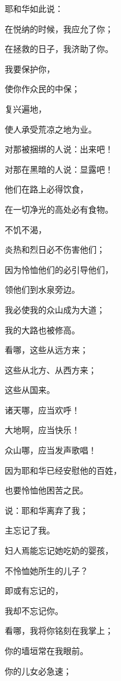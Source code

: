 {\par }{\Q {}耶和华如此说：
\par }{\Q 在悦纳的时候，我应允了你；
\par }{\Q 在拯救的日子，我济助了你。
\par }{\Q 我要保护你，
\par }{\Q 使你作众民的中保；
\par }{\Q 复兴遍地，
\par }{\Q 使人承受荒凉之地为业。
\par }{\Q {}对那被捆绑的人说：出来吧！
\par }{\Q 对那在黑暗的人说：显露吧！
\par }{\Q 他们在路上必得饮食，
\par }{\Q 在一切净光的高处必有食物。
\par }{\Q {}不饥不渴，
\par }{\Q 炎热和烈日必不伤害他们；
\par }{\Q 因为怜恤他们的必引导他们，
\par }{\Q 领他们到水泉旁边。
\par }{\Q {}我必使我的众山成为大道；
\par }{\Q 我的大路也被修高。
\par }{\Q {}看哪，这些从远方来；
\par }{\Q 这些从北方、从西方来；
\par }{\Q 这些从{}国来。
\par }{\Q {}诸天哪，应当欢呼！
\par }{\Q 大地啊，应当快乐！
\par }{\Q 众山哪，应当发声歌唱！
\par }{\Q 因为耶和华已经安慰他的百姓，
\par }{\Q 也要怜恤他困苦之民。
\par }{\BB \par }{\Q {}说：耶和华离弃了我；
\par }{\Q 主忘记了我。
\par }{\Q {}妇人焉能忘记她吃奶的婴孩，
\par }{\Q 不怜恤她所生的儿子？
\par }{\Q 即或有忘记的，
\par }{\Q 我却不忘记你。
\par }{\Q {}看哪，我将你铭刻在我掌上；
\par }{\Q 你的墙垣常在我眼前。
\par }{\Q {}你的儿女必急速{}；
}
